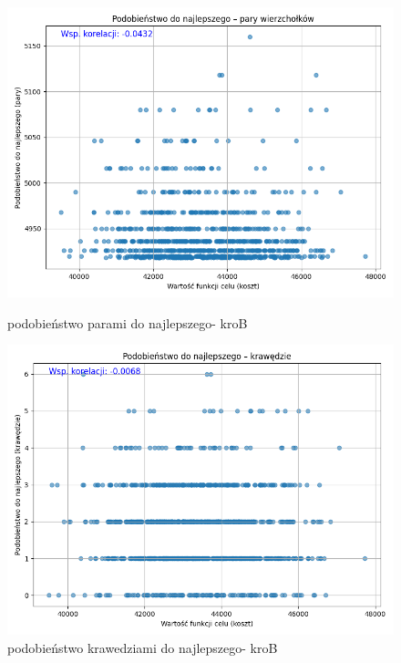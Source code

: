 \documentclass[11pt]{article}
\begin{document}
\begin{figure}[H]
    \begin{minipage}[t]{0.45\textwidth}
        \centering
        \includegraphics[width=\linewidth]{wypuklosci/podobienstwo-naj-parami-kroB}
        \caption{podobieństwo parami do najlepszego- kroB}
    \end{minipage}
    \hfill
    \begin{minipage}[t]{0.45\textwidth}
        \centering
        \includegraphics[width=\linewidth]{wypuklosci/podobienstwo-naj-krawedziami-kroB}
        \caption{podobieństwo krawedziami do najlepszego- kroB}
    \end{minipage}\label{fig:figure14}
\end{figure}
\end{document}

